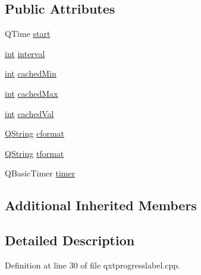 \subsection*{Public Attributes}
\begin{DoxyCompactItemize}
\item 
Q\-Time \hyperlink{class_qxt_progress_label_private_a8e39982e3e0637c9d013db0dfb357689}{start}
\item 
\hyperlink{ioapi_8h_a787fa3cf048117ba7123753c1e74fcd6}{int} \hyperlink{class_qxt_progress_label_private_aa7ab0a6fec4fd9e5957d23f1450fab3c}{interval}
\item 
\hyperlink{ioapi_8h_a787fa3cf048117ba7123753c1e74fcd6}{int} \hyperlink{class_qxt_progress_label_private_a00c84be52dfa6c6d842a2635c782e7f0}{cached\-Min}
\item 
\hyperlink{ioapi_8h_a787fa3cf048117ba7123753c1e74fcd6}{int} \hyperlink{class_qxt_progress_label_private_a2525c3c5fe410a691cff6260e0b81c82}{cached\-Max}
\item 
\hyperlink{ioapi_8h_a787fa3cf048117ba7123753c1e74fcd6}{int} \hyperlink{class_qxt_progress_label_private_a1bb19ab9ff0387503c9b14cfbc134953}{cached\-Val}
\item 
\hyperlink{group___u_a_v_objects_plugin_gab9d252f49c333c94a72f97ce3105a32d}{Q\-String} \hyperlink{class_qxt_progress_label_private_a8eac5788df3296785955b8c1527e747e}{cformat}
\item 
\hyperlink{group___u_a_v_objects_plugin_gab9d252f49c333c94a72f97ce3105a32d}{Q\-String} \hyperlink{class_qxt_progress_label_private_a45fe76030ddf8fa0a636ee0f0027dea9}{tformat}
\item 
Q\-Basic\-Timer \hyperlink{class_qxt_progress_label_private_ac5d84d9a391a0475c703a86055e762ba}{timer}
\end{DoxyCompactItemize}
\subsection*{Additional Inherited Members}


\subsection{Detailed Description}


Definition at line 30 of file qxtprogresslabel.\-cpp.



